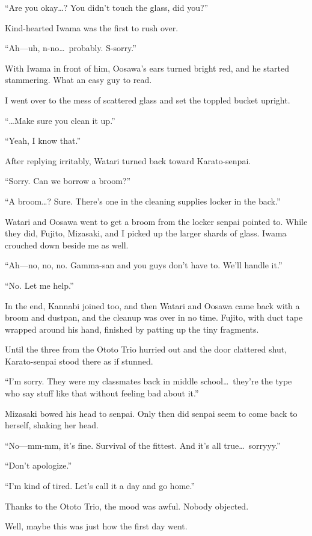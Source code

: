 \documentclass[
    a4paper,
    12pt,
    twoside,
    openany,
    UTF8,
    fontset=windows
]{ctexbook}
\begin{document}
``Are you okay\dots? You didn't touch the glass, did you?''

Kind-hearted Iwama was the first to rush over.

``Ah---uh, n-no\dots\ probably. S-sorry.''

With Iwama in front of him, Oosawa's ears turned bright red, and he started stammering. What an easy guy to read.

I went over to the mess of scattered glass and set the toppled bucket upright.

``\dots Make sure you clean it up.''

``Yeah, I know that.''

After replying irritably, Watari turned back toward Karato-senpai.

``Sorry. Can we borrow a broom?''

``A broom\dots? Sure. There's one in the cleaning supplies locker in the back.''

Watari and Oosawa went to get a broom from the locker senpai pointed to. While they did, Fujito, Mizasaki, and I picked up the larger shards of glass. Iwama crouched down beside me as well.

``Ah---no, no, no. Gamma-san and you guys don't have to. We'll handle it.''

``No. Let me help.''

In the end, Kannabi joined too, and then Watari and Oosawa came back with a broom and dustpan, and the cleanup was over in no time. Fujito, with duct tape wrapped around his hand, finished by patting up the tiny fragments.

Until the three from the Ototo Trio hurried out and the door clattered shut, Karato-senpai stood there as if stunned.

``I'm sorry. They were my classmates back in middle school\dots\ they're the type who say stuff like that without feeling bad about it.''

Mizasaki bowed his head to senpai. Only then did senpai seem to come back to herself, shaking her head.

``No---mm-mm, it's fine. Survival of the fittest. And it's all true\dots\ sorryyy.''

``Don't apologize.''

``I'm kind of tired. Let's call it a day and go home.''

Thanks to the Ototo Trio, the mood was awful. Nobody objected.

Well, maybe this was just how the first day went.
\end{document}
